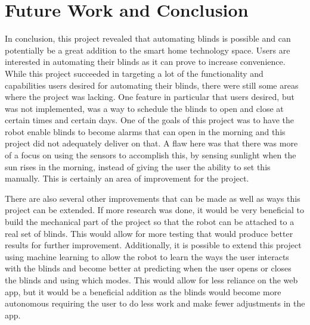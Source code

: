 \documentclass[10pt,twocolumn]{article}
\begin{document}
\section{Future Work and Conclusion}
In conclusion, this project revealed that automating blinds is possible and can potentially be a great addition to the smart home technology space. Users are interested in automating their blinds as it can prove to increase convenience. While this project succeeded in targeting a lot of the functionality and capabilities users desired for automating their blinds, there were still some areas where the project was lacking. One feature in particular that users desired, but was not implemented, was a way to schedule the blinds to open and close at certain times and certain days. One of the goals of this project was to have the robot enable blinds to become alarms that can open in the morning and this project did not adequately deliver on that. A flaw here was that there was more of a focus on using the sensors to accomplish this, by sensing sunlight when the sun rises in the morning, instead of giving the user the ability to set this manually. This is certainly an area of improvement for the project.

There are also several other improvements that can be made as well as ways this project can be extended. If more research was done, it would be very beneficial to build the mechanical part of the project so that the robot can be attached to a real set of blinds. This would allow for more testing that would produce better results for further improvement. Additionally, it is possible to extend this project using machine learning to allow the robot to learn the ways the user interacts with the blinds and become better at predicting when the user opens or closes the blinds and using which modes. This would allow for less reliance on the web app, but it would be a beneficial addition as the blinds would become more autonomous requiring the user to do less work and make fewer adjustments in the app.

\printbibliography
\end{document}
